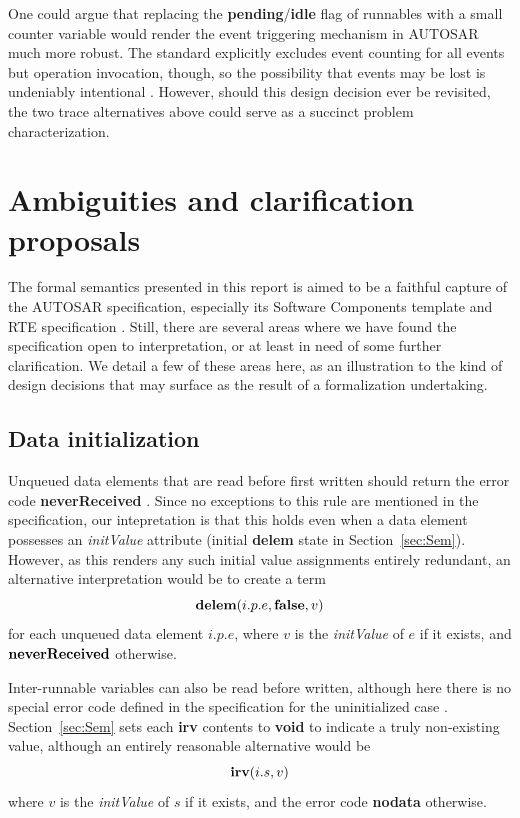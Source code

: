 \documentclass[twocolumn]{article}
\begin{document}
One could argue that replacing the {\bf pending}/{\bf idle} flag of runnables with a small counter variable would render the event triggering mechanism in AUTOSAR much more robust. The standard explicitly excludes event counting for all events but operation invocation, though, so the possibility that events may be lost is undeniably intentional \cite[ch.~4.2.3]{AR:RTE}. However, should this design decision ever be revisited, the two trace alternatives above could serve as a succinct problem characterization.


\section{Ambiguities and clarification proposals}
\label{sec:Amb}

The formal semantics presented in this report is aimed to be a faithful capture of the AUTOSAR specification, especially its Software Components template and RTE specification \cite{AR:SWC, AR:RTE}. Still, there are several areas where we have found the specification open to interpretation, or at least in need of some further clarification. We detail a few of these areas here, as an illustration to the kind of design decisions that may surface as the result of a formalization undertaking.


\subsection{Data initialization}

Unqueued data elements that are read before first written should return the error code {\bf neverReceived} \cite[ch.~5.6.10]{AR:RTE}. Since no exceptions to this rule are mentioned in the specification, our intepretation is that this holds even when a data element possesses an \emph{initValue} attribute  (initial {\bf delem} state in Section~\ref{sec:Sem}). However, as this renders any such initial value assignments entirely redundant, an alternative interpretation would be to create a term
$$
  \textbf{delem}(i.p.e,\textbf{false},v)
$$
for each unqueued data element $i.p.e$, where $v$ is the \emph{initValue} of $e$ if it exists, and $\textbf{neverReceived}$ otherwise.

Inter-runnable variables can also be read before written, although here there is no special error code defined in the specification for the uninitialized case \cite[ch.~5.6.26]{AR:RTE}. Section~\ref{sec:Sem} sets each {\bf irv} contents to {\bf void} to indicate a truly non-existing value, although an entirely reasonable alternative would be
$$
  \textbf{irv}(i.s,v)
$$
where $v$ is the \emph{initValue} of $s$ if it exists, and the error code {\bf nodata} otherwise.
\end{document}
